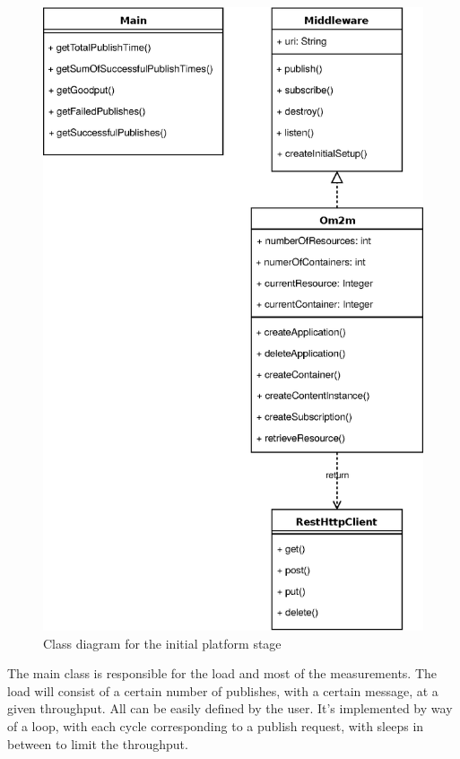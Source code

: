 \documentclass[conference]{IEEEtran}
\begin{document}
\begin{figure}[htbp!]
  \centering
  \includegraphics[width=\linewidth]{figures/class_diagram.eps}
  \caption{Class diagram for the initial platform stage}
  \label{fig:class_diagram_om2m}
\end{figure}

The main class is responsible for the load and most of the measurements. The load will consist of a certain number of publishes, with a certain message, at a given throughput. All can be easily defined by the user. It's implemented by way of a loop, with each cycle corresponding to a publish request, with sleeps in between to limit the throughput.
\end{document}

